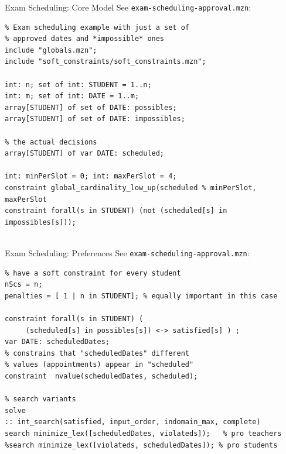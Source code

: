\documentclass[10pt,xcolor={dvipsnames},fleqn]{beamer}
\begin{document}
\begin{frame}[fragile]{Exam Scheduling: Core Model}
See \texttt{exam-scheduling-approval.mzn}:
\begin{lstlisting}
% Exam scheduling example with just a set of 
% approved dates and *impossible* ones
include "globals.mzn";
include "soft_constraints/soft_constraints.mzn";

int: n; set of int: STUDENT = 1..n; 
int: m; set of int: DATE = 1..m;
array[STUDENT] of set of DATE: possibles;
array[STUDENT] of set of DATE: impossibles;

% the actual decisions
array[STUDENT] of var DATE: scheduled;

int: minPerSlot = 0; int: maxPerSlot = 4;
constraint global_cardinality_low_up(scheduled % minPerSlot, maxPerSlot
constraint forall(s in STUDENT) (not (scheduled[s] in impossibles[s])); 
 
\end{lstlisting}
\end{frame}

\begin{frame}[fragile]{Exam Scheduling: Preferences}
See \texttt{exam-scheduling-approval.mzn}:
\begin{lstlisting}
% have a soft constraint for every student
nScs = n;
penalties = [ 1 | n in STUDENT]; % equally important in this case 

constraint forall(s in STUDENT) ( 
     (scheduled[s] in possibles[s]) <-> satisfied[s] ) ;
var DATE: scheduledDates;
% constrains that "scheduledDates" different 
% values (appointments) appear in "scheduled"
constraint  nvalue(scheduledDates, scheduled);

% search variants 
solve 
:: int_search(satisfied, input_order, indomain_max, complete)
search minimize_lex([scheduledDates, violateds]);   % pro teachers
%search minimize_lex([violateds, scheduledDates]); % pro students
\end{lstlisting}
\end{frame}
\end{document}
